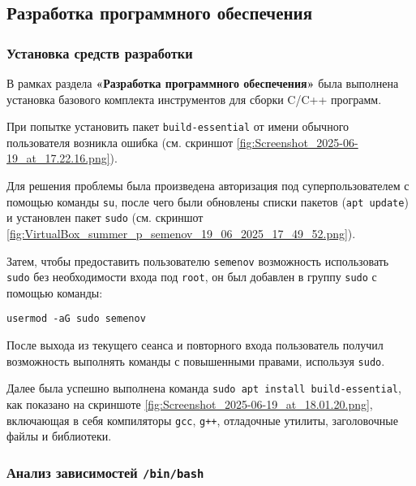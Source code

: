 \subsection{Разработка программного обеспечения}

\subsubsection{Установка средств разработки}

В рамках раздела \textbf{«Разработка программного обеспечения»} была выполнена установка базового комплекта инструментов для сборки C/C++ программ.

При попытке установить пакет \texttt{build-essential} от имени обычного пользователя возникла ошибка (см. скриншот \ref{fig:Screenshot_2025-06-19_at_17.22.16.png}). 


Для решения проблемы была произведена авторизация под суперпользователем с помощью команды \texttt{su}, после чего были обновлены списки пакетов (\texttt{apt update}) и установлен пакет \texttt{sudo} (см. скриншот \ref{fig:VirtualBox_summer_p_semenov_19_06_2025_17_49_52.png}). 


Затем, чтобы предоставить пользователю \texttt{semenov} возможность использовать \texttt{sudo} без необходимости входа под \texttt{root}, он был добавлен в группу \texttt{sudo} с помощью команды:

\begin{verbatim}
usermod -aG sudo semenov
\end{verbatim}

После выхода из текущего сеанса и повторного входа пользователь получил возможность выполнять команды с повышенными правами, используя \texttt{sudo}.

Далее была успешно выполнена команда \texttt{sudo apt install build-essential}, как показано на скриншоте \ref{fig:Screenshot_2025-06-19_at_18.01.20.png}, включающая в себя компиляторы \texttt{gcc}, \texttt{g++}, отладочные утилиты, заголовочные файлы и библиотеки.


\subsubsection{Анализ зависимостей \texttt{/bin/bash}}

